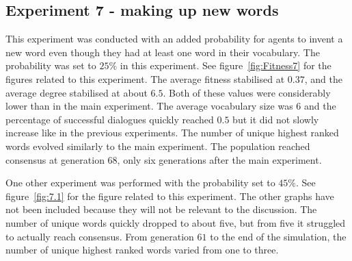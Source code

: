 \clearpage
\subsection{Experiment 7 - making up new words}
This experiment was conducted with an added probability for agents to invent a new word even though they had at least one word in their vocabulary. The probability was set to $25\%$ in this experiment. See figure~\ref{fig:Fitness7} for the figures related to this experiment. The average fitness stabilised at $0.37$, and the average degree stabilised at about $6.5$. Both of these values were considerably lower than in the main experiment. The average vocabulary size was $6$ and the percentage of successful dialogues quickly reached $0.5$ but it did not slowly increase like in the previous experiments. The number of unique highest ranked words evolved similarly to the main experiment. The population reached consensus at generation $68$, only six generations after the main experiment. 

One other experiment was performed with the probability set to $45\%$. See figure~\ref{fig:7.1} for the figure related to this experiment. The other graphs have not been included because they will not be relevant to the discussion. The number of unique words quickly dropped to about five, but from five it struggled to actually reach consensus. From generation $61$ to the end of the simulation, the number of unique highest ranked words varied from one to three.  

